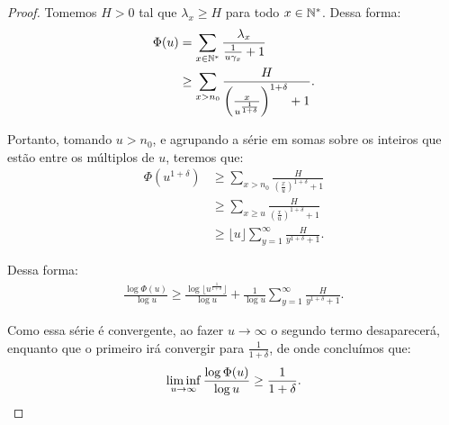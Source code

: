 \begin{proof}
  Tomemos $H > 0$ tal que $\lambda_x \geq H$ para todo $x \in {\mathbb{N^*}}$. Dessa
  forma:
  \begin{align*}
    \Phi(u) &= \sum_{x \in {\mathbb{N^*}}} \frac{\lambda_x}{\frac{1}{u\gamma_x} +
      1}\\
    &\geq \sum_{x > n_0}
    \frac{H}{\left(\frac{x}{u^{\frac{1}{1+\delta}}}\right)^{1+\delta} +1}.
  \end{align*}

  Portanto, tomando $u > n_0$, e agrupando a série em somas sobre os inteiros
  que estão entre os múltiplos de $u$, teremos que:
  \begin{align*}
    \Phi(u^{1+\delta}) 
    &\geq \sum_{x > n_0}
    \frac{H}{\left(\frac{x}{u}\right)^{1+\delta} +1}\\
    &\geq \sum_{x \geq u}
    \frac{H}{\left(\frac{x}{u}\right)^{1+\delta} +1}\\
    &\geq \lfloor u \rfloor \sum_{y = 1}^{\infty}
    \frac{H}{y^{1+\delta} + 1}.
  \end{align*}

  Dessa forma:
  \begin{align*}
    \frac{\log \Phi(u)}{\log u} \geq \frac{\log\lfloor
      u^{\frac{1}{1+\delta}} \rfloor }{\log u} + 
    \frac{1}{\log u} \sum_{y = 1}^{\infty}
    \frac{H}{y^{1+\delta} + 1}.
  \end{align*}

  Como essa série é convergente, ao fazer $u \to \infty$ o segundo
  termo desaparecerá, enquanto que o primeiro irá convergir para
  $\frac{1}{1+\delta}$, de onde concluímos que:
  \begin{displaymath}
    \liminf_{u \to \infty} \frac{\log \Phi (u)}{\log u} \geq
    \frac{1}{1+\delta} .
    \qedhere
  \end{displaymath}
\end{proof}


